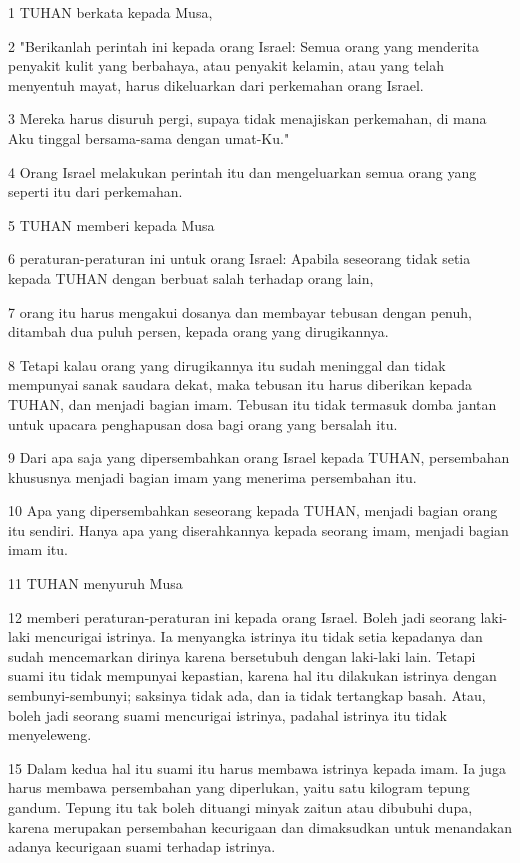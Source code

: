 \par 1 TUHAN berkata kepada Musa,
\par 2 "Berikanlah perintah ini kepada orang Israel: Semua orang yang menderita penyakit kulit yang berbahaya, atau penyakit kelamin, atau yang telah menyentuh mayat, harus dikeluarkan dari perkemahan orang Israel.
\par 3 Mereka harus disuruh pergi, supaya tidak menajiskan perkemahan, di mana Aku tinggal bersama-sama dengan umat-Ku."
\par 4 Orang Israel melakukan perintah itu dan mengeluarkan semua orang yang seperti itu dari perkemahan.
\par 5 TUHAN memberi kepada Musa
\par 6 peraturan-peraturan ini untuk orang Israel: Apabila seseorang tidak setia kepada TUHAN dengan berbuat salah terhadap orang lain,
\par 7 orang itu harus mengakui dosanya dan membayar tebusan dengan penuh, ditambah dua puluh persen, kepada orang yang dirugikannya.
\par 8 Tetapi kalau orang yang dirugikannya itu sudah meninggal dan tidak mempunyai sanak saudara dekat, maka tebusan itu harus diberikan kepada TUHAN, dan menjadi bagian imam. Tebusan itu tidak termasuk domba jantan untuk upacara penghapusan dosa bagi orang yang bersalah itu.
\par 9 Dari apa saja yang dipersembahkan orang Israel kepada TUHAN, persembahan khususnya menjadi bagian imam yang menerima persembahan itu.
\par 10 Apa yang dipersembahkan seseorang kepada TUHAN, menjadi bagian orang itu sendiri. Hanya apa yang diserahkannya kepada seorang imam, menjadi bagian imam itu.
\par 11 TUHAN menyuruh Musa
\par 12 memberi peraturan-peraturan ini kepada orang Israel. Boleh jadi seorang laki-laki mencurigai istrinya. Ia menyangka istrinya itu tidak setia kepadanya dan sudah mencemarkan dirinya karena bersetubuh dengan laki-laki lain. Tetapi suami itu tidak mempunyai kepastian, karena hal itu dilakukan istrinya dengan sembunyi-sembunyi; saksinya tidak ada, dan ia tidak tertangkap basah. Atau, boleh jadi seorang suami mencurigai istrinya, padahal istrinya itu tidak menyeleweng.
\par 15 Dalam kedua hal itu suami itu harus membawa istrinya kepada imam. Ia juga harus membawa persembahan yang diperlukan, yaitu satu kilogram tepung gandum. Tepung itu tak boleh dituangi minyak zaitun atau dibubuhi dupa, karena merupakan persembahan kecurigaan dan dimaksudkan untuk menandakan adanya kecurigaan suami terhadap istrinya.
